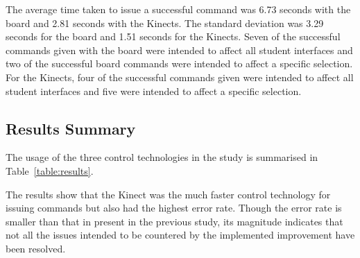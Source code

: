 \documentclass[manuscript, review, screen]{acmart}
\begin{document}
The average time taken to issue a successful command was 6.73 seconds with the board and 2.81 seconds with the Kinects.
The standard deviation was 3.29 seconds for the board and 1.51 seconds for the Kinects.
Seven of the successful commands given with the board were intended to affect all student interfaces and two of the successful board commands were intended to affect a specific selection.
For the Kinects, four of the successful commands given were intended to affect all student interfaces and five were intended to affect a specific selection.

\subsection{Results Summary}
\label{sec:results:summary}  

The usage of the three control technologies in the study is summarised in Table~\ref{table:results}.


The results show that the Kinect was the much faster control technology for issuing commands but also had the highest error rate.
Though the error rate is smaller than that in present in the previous study, its magnitude indicates that not all the issues intended to be countered by the implemented improvement have been resolved.
\end{document}
